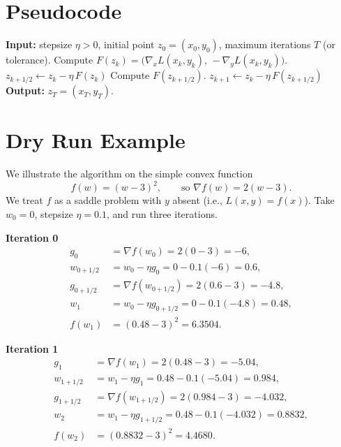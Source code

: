 \documentclass[11pt]{article}
\begin{document}
\section*{Pseudocode}
\begin{algorithm}[H]
\caption{Extra‑Gradient Method}
\begin{algorithmic}[1]
\STATE \textbf{Input:} stepsize $\eta>0$, initial point $z_0=(x_0,y_0)$,
maximum iterations $T$ (or tolerance).
    \STATE Compute $F(z_k)=\big(\nabla_x L(x_k,y_k),\,-\nabla_y L(x_k,y_k)\big)$.
    \STATE $z_{k+1/2}\gets z_k-\eta\,F(z_k)$ \hfill{}
    \STATE Compute $F(z_{k+1/2})$.
    \STATE $z_{k+1}\gets z_k-\eta\,F(z_{k+1/2})$ \hfill{}
\ENDFOR
\STATE \textbf{Output:} $z_T=(x_T,y_T)$.
\end{algorithmic}
\end{algorithm}

\bigskip

\section*{Dry Run Example}
We illustrate the algorithm on the simple convex function
\[
f(w)=(w-3)^2,
\qquad\text{so } \nabla f(w)=2(w-3).
\]
We treat $f$ as a saddle problem with $y$ absent (i.e., $L(x,y)=f(x)$).  
Take $w_0=0$, stepsize $\eta=0.1$, and run three iterations.

\medskip
\noindent\textbf{Iteration 0}
\[
\begin{aligned}
g_0 &=\nabla f(w_0)=2(0-3)=-6,\\
w_{0+1/2}&=w_0-\eta g_0=0-0.1(-6)=0.6,\\
g_{0+1/2}&=\nabla f(w_{0+1/2})=2(0.6-3)=-4.8,\\
w_{1}&=w_0-\eta g_{0+1/2}=0-0.1(-4.8)=0.48,\\
f(w_1)&=(0.48-3)^2=6.3504.
\end{aligned}
\]

\noindent\textbf{Iteration 1}
\[
\begin{aligned}
g_1 &=\nabla f(w_1)=2(0.48-3)=-5.04,\\
w_{1+1/2}&=w_1-\eta g_1=0.48-0.1(-5.04)=0.984,\\
g_{1+1/2}&=\nabla f(w_{1+1/2})=2(0.984-3)=-4.032,\\
w_{2}&=w_1-\eta g_{1+1/2}=0.48-0.1(-4.032)=0.8832,\\
f(w_2)&=(0.8832-3)^2=4.4680.
\end{aligned}
\]
\end{document}
